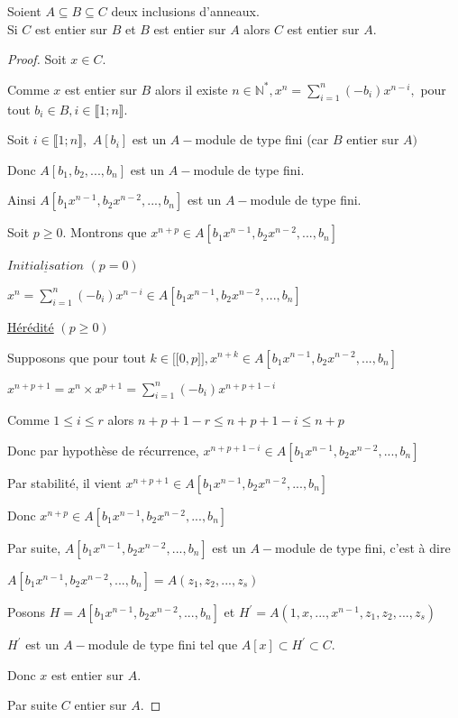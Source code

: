 \begin{moncorollaire}
	Soient $A \subseteq B \subseteq C $ deux inclusions d'anneaux.\\
	Si $C$ est entier sur $B$ et $B$ est entier sur $A$ alors $C$ est entier sur $A$.
\end{moncorollaire}
\begin{proof}
	Soit $x\in C.$
	
	Comme $x$ est entier sur $B$ alors il existe $n\in \mathbb{N}^{\ast },x^{n}=\sum\limits_{i=1}^{n}(-b_{i})x^{n-i},$ pour tout $b_{i}\in
	B,i\in \llbracket 1; n \rrbracket.$
	
	Soit $i\in \llbracket 1; n \rrbracket,$ $A[b_{i}]$ est un $A-$module de type fini
	(car $B$ entier sur $A)$
	
	Donc $A[b_{1},b_{2},...,b_{n}]$ est un $A-$module de type fini.
	
	Ainsi $A[b_{1}x^{n-1},b_{2}x^{n-2},...,b_{n}]$ est un $A-$module de type
	fini.
	
	Soit $p\geq 0.$ Montrons que $x^{n+p}\in
	A[b_{1}x^{n-1},b_{2}x^{n-2},...,b_{n}]$
	
	$\underline{Initialisation}$ $(p=0)$
	
	$x^{n}=\sum\limits_{i=1}^{n}(-b_{i})x^{n-i}\in
	A[b_{1}x^{n-1},b_{2}x^{n-2},...,b_{n}]$
	
	\underline{Hérédité} $(p\geq 0)$
	
	Supposons que pour tout $k\in \lbrack \lbrack 0,p]],x^{n+k}\in
	A[b_{1}x^{n-1},b_{2}x^{n-2},...,b_{n}]$
	
	$x^{n+p+1}=x^{n}\times x^{p+1}=\sum\limits_{i=1}^{n}(-b_{i})x^{n+p+1-i}$
	
	Comme $1\leq i\leq r$ alors $n+p+1-r\leq n+p+1-i\leq n+p$
	
	Donc par hypothèse de récurrence, $x^{n+p+1-i}\in
	A[b_{1}x^{n-1},b_{2}x^{n-2},...,b_{n}]$
	
	Par stabilité, il vient $x^{n+p+1}\in
	A[b_{1}x^{n-1},b_{2}x^{n-2},...,b_{n}]$
	
	Donc $x^{n+p}\in A[b_{1}x^{n-1},b_{2}x^{n-2},...,b_{n}]$
	
	Par suite, $A[b_{1}x^{n-1},b_{2}x^{n-2},...,b_{n}]$ est un $A-$module de
	type fini, c'est à dire 
	
	$A[b_{1}x^{n-1},b_{2}x^{n-2},...,b_{n}]=A(z_{1},z_{2},...,z_{s})$
	
	Posons $H=A[b_{1}x^{n-1},b_{2}x^{n-2},...,b_{n}]$ et $H^{\prime
	}=A(1,x,...,x^{n-1},z_{1},z_{2},...,z_{s})$
	
	$H^{\prime }$ est un $A-$module de type fini tel que $A[x]\subset H^{\prime
	}\subset C.$
	
	Donc $x$ est entier sur $A.$
	
	Par suite $C$ entier sur $A.$
\end{proof}
